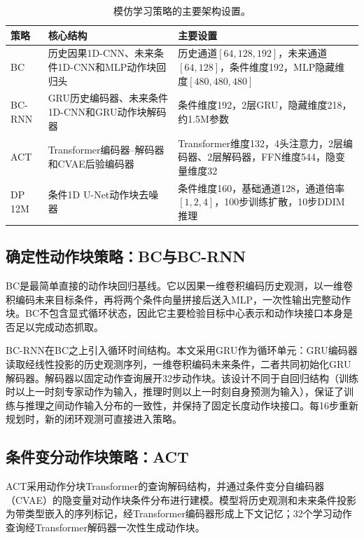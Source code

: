 \begin{table}[!htbp]
    \caption{模仿学习策略的主要架构设置。}
    \label{tab:model-architecture-summary}
    \centering
    \small
    \renewcommand{\arraystretch}{1.15}
    \begin{tabularx}{\textwidth}{>{\raggedright\arraybackslash}p{}>{\raggedright\arraybackslash}p{}Y}
        \hline
        策略 & 核心结构 & 主要设置 \\
        \hline
        BC & 历史因果1D-CNN、未来条件1D-CNN和MLP动作块回归头 & 历史通道$[64,128,192]$，未来通道$[64,128]$，条件维度192，MLP隐藏维度$[480,480,480]$ \\
        BC-RNN & GRU历史编码器、未来条件1D-CNN和GRU动作块解码器 & 条件维度192，2层GRU，隐藏维度218，约1.5M参数 \\
        ACT & Transformer编码器--解码器和CVAE后验编码器 & Transformer维度132，4头注意力，2层编码器、2层解码器，FFN维度544，隐变量维度32 \\
        DP 12M & 条件1D U-Net动作块去噪器 & 条件维度160，基础通道128，通道倍率$[1,2,4]$，100步训练扩散，10步DDIM推理 \\
        \hline
    \end{tabularx}
\end{table}

\subsection{确定性动作块策略：BC与BC-RNN}

BC是最简单直接的动作块回归基线。它以因果一维卷积编码历史观测，以一维卷积编码未来目标条件，再将两个条件向量拼接后送入MLP，一次性输出完整动作块。BC不包含显式循环状态，因此它主要检验目标中心表示和动作块接口本身是否足以完成动态抓取。

BC-RNN在BC之上引入循环时间结构。本文采用GRU作为循环单元\citep{cho2014learning,chung2014empirical}：GRU编码器读取经线性投影的历史观测序列，一维卷积编码未来条件，二者共同初始化GRU解码器。解码器以固定动作查询展开32步动作块。该设计不同于自回归结构（训练时以上一时刻专家动作为输入，推理时则以上一时刻自身预测为输入），保证了训练与推理之间动作输入分布的一致性，并保持了固定长度动作块接口。每16步重新规划时，新的闭环观测可直接进入策略。

\subsection{条件变分动作块策略：ACT}

ACT采用动作分块Transformer的查询解码结构，并通过条件变分自编码器（CVAE）的隐变量对动作块条件分布进行建模\citep{zhao2023learning,kingma2014autoencoding,sohn2015learning}。模型将历史观测和未来条件投影为带类型嵌入的序列标记，经Transformer编码器形成上下文记忆；32个学习动作查询经Transformer解码器一次性生成动作块。

